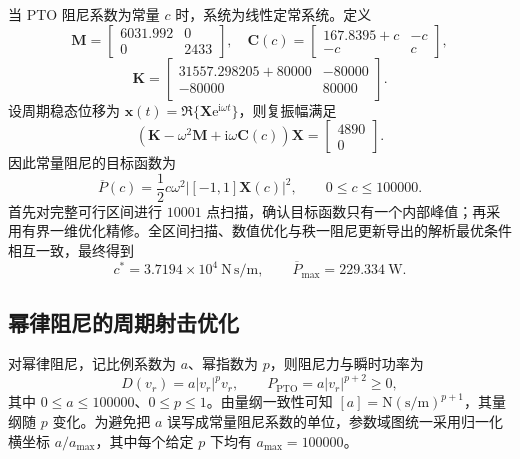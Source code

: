 \documentclass[withoutpreface]{../../../templates/CUMCM2026-Complete-LaTeX/cumcmthesis}
\begin{document}
当 PTO 阻尼系数为常量 $c$ 时，系统为线性定常系统。定义
\begin{equation}
  \boldsymbol M=
  \begin{bmatrix}6031.992&0\\0&2433\end{bmatrix},\quad
  \boldsymbol C(c)=
  \begin{bmatrix}167.8395+c&-c\\-c&c\end{bmatrix},
  \label{eq:q2-mc}
\end{equation}
\begin{equation}
  \boldsymbol K=
  \begin{bmatrix}31557.298205+80000&-80000\\-80000&80000\end{bmatrix}.
  \label{eq:q2-k}
\end{equation}
设周期稳态位移为 $\boldsymbol x(t)=\Re\{\boldsymbol X\mathrm{e}^{\mathrm{i}\omega t}\}$，则复振幅满足
\begin{equation}
  \left(\boldsymbol K-\omega^2\boldsymbol M
  +\mathrm{i}\omega\boldsymbol C(c)\right)\boldsymbol X
  =\begin{bmatrix}4890\\0\end{bmatrix}.
  \label{eq:q2-frequency-domain}
\end{equation}
因此常量阻尼的目标函数为
\begin{equation}
  \overline P(c)=\frac{1}{2}c\omega^2
  \left|[-1,1]\boldsymbol X(c)\right|^2,
  \qquad 0\leq c\leq100000.
  \label{eq:q2-constant-objective}
\end{equation}
首先对完整可行区间进行 $10001$ 点扫描，确认目标函数只有一个内部峰值；再采用有界一维优化精修。全区间扫描、数值优化与秩一阻尼更新导出的解析最优条件相互一致，最终得到
\begin{equation}
  \boxed{c^*=3.7194\times10^4\ \mathrm{N\,s/m}},\qquad
  \boxed{\overline P_{\max}=229.334\ \mathrm{W}}.
  \label{eq:q2-constant-result}
\end{equation}

\subsection{幂律阻尼的周期射击优化}

对幂律阻尼，记比例系数为 $a$、幂指数为 $p$，则阻尼力与瞬时功率为
\begin{equation}
  D(v_r)=a|v_r|^pv_r,\qquad
  P_{\mathrm{PTO}}=a|v_r|^{p+2}\geq0,
  \label{eq:q2-power-law}
\end{equation}
其中 $0\leq a\leq100000$、$0\leq p\leq1$。由量纲一致性可知 $[a]=\mathrm{N}(\mathrm{s/m})^{p+1}$，其量纲随 $p$ 变化。为避免把 $a$ 误写成常量阻尼系数的单位，参数域图统一采用归一化横坐标 $a/a_{\max}$，其中每个给定 $p$ 下均有 $a_{\max}=100000$。
\end{document}
